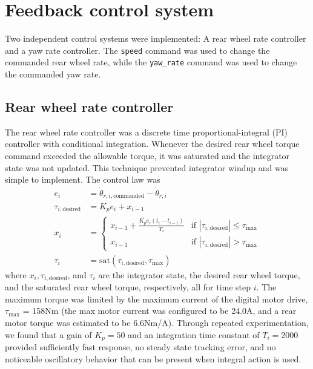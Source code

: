 \section{Feedback control system}
Two independent control systems were implemented: A rear wheel rate controller
and a yaw rate controller. The \verb|speed| command was used to change the
commanded rear wheel rate, while the \verb|yaw_rate| command was used to change
the commanded yaw rate.

\subsection{Rear wheel rate controller} \label{rb:subsec:rw_control}
The rear wheel rate controller was a discrete time proportional-integral (PI)
controller with conditional integration. Whenever the desired rear
wheel torque command exceeded the allowable torque, it was saturated and the
integrator state was not updated. This technique prevented integrator windup
and was simple to implement. The control law was
\begin{align}
  e_i &= \dot{\theta}_{r,i,\text{commanded}} - \dot{\theta}_{r,i} \\
  \tau_{i,\text{desired}} &= K_p e_i + x_{i-1}\\
  x_{i} &= \left\{
      \begin{matrix}
        x_{i-1} + \frac{K_p e_i (t_i - t_{i-1})}{T_i} & \text{if } |\tau_{i,\text{desired}}| \leq \tau_{\text{max}} \\
        x_{i-1} & \text{if } |\tau_{i,\text{desired}}| > \tau_{\text{max}}
      \end{matrix}
    \right. \\
  \tau_{i} &= \text{sat}(\tau_{i, \text{desired}}, \tau_{\text{max}})
\end{align}
where $x_{i}, \tau_{i,\text{desired}}$, and  $\tau_{i}$ are the integrator
state, the desired rear wheel torque, and the saturated rear wheel torque,
respectively, all for time step $i$. The maximum torque was limited by the
maximum current of the digital motor drive, $\tau_{\text{max}}$ = 158Nm (the
max motor current was configured to be 24.0A, and a rear motor torque was
estimated to be 6.6Nm/A). Through repeated experimentation, we found that a
gain of $K_p =50$ and an integration time constant of $T_i = 2000$ provided
sufficiently fast response, no steady state tracking error, and no noticeable
oscillatory behavior that can be present when integral action is used.

